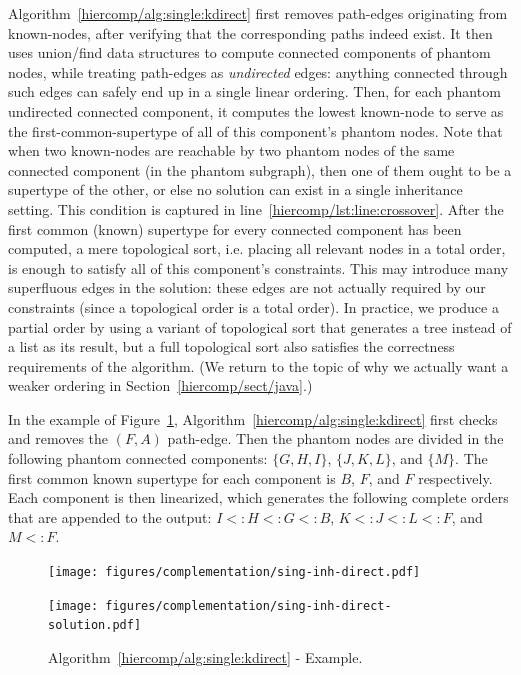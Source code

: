 Algorithm~\ref{hiercomp/alg:single:kdirect} first removes path-edges
originating from known-nodes, after verifying that the corresponding
paths indeed exist. It then uses union/find data structures to compute
connected components of phantom nodes, while treating path-edges
as \emph{undirected} edges: anything connected through such edges can
safely end up in a single linear ordering. Then, for each phantom
undirected connected component, it computes the lowest known-node to
serve as the first-common-supertype of all of this component's phantom
nodes. Note that when two known-nodes are reachable by two phantom
nodes of the same connected component (in the phantom subgraph), then
one of them ought to be a supertype of the other, or else no solution
can exist in a single inheritance setting. This condition is captured
in line~\ref{hiercomp/lst:line:crossover}. After the first common (known)
supertype for every connected component has been computed, a mere
topological sort, i.e. placing all relevant nodes in a total order, is
enough to satisfy all of this component's constraints. This may
introduce many superfluous edges in the solution: these edges are not
actually required by our constraints (since a topological order is a
total order). In practice, we produce a partial order by using a
variant of topological sort that generates a tree instead of a list as
its result, but a full topological sort also satisfies the correctness
requirements of the algorithm. (We return to the topic of why we
actually want a weaker ordering in Section~\ref{hiercomp/sect/java}.)

In the example of Figure~\ref{hiercomp/fig:kdirect:ex},
Algorithm~\ref{hiercomp/alg:single:kdirect} first checks and removes the
$(F,A)$ path-edge. Then the phantom nodes are divided in the following
phantom connected components: $\{G,H,I\}$, $\{J,K,L\}$, and
$\{M\}$. The first common known supertype for each component is $B$,
$F$, and $F$ respectively. Each component is then linearized, which
generates the following complete orders that are appended to the
output: $I <: H <: G <: B$, $K <: J <: L <: F$, and $M <: F$.


\begin{figure}[t]
  \begin{minipage}[b]{.5\linewidth}
    \centering
    \texttt{[image: figures/complementation/sing-inh-direct.pdf]}
    \label{hiercomp/fig:stree1:simple}
  \end{minipage}
  \begin{minipage}[b]{.5\linewidth}
    \centering
    \texttt{[image: figures/complementation/sing-inh-direct-solution.pdf]}
    \label{hiercomp/fig:cgraph1:simple}
  \end{minipage}
  \caption[Single Inheritance Algorithm Example]{%
    Algorithm~\ref{hiercomp/alg:single:kdirect} - Example. }
  \label{hiercomp/fig:kdirect:ex}
\end{figure}

